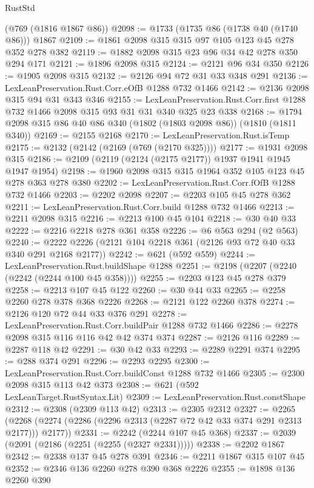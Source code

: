 \begin{lexlean}{RustStd}
\begin{coremodule}
    (@769 (@1816 @1867 @86))
@2098 := @1733 (@1735 @86 (@1738 @40 (@1740 @86))) @1867
@2109 := @1861 @2098 @315 @315 @97 @105 @123 @45 @278 @352 @278 @382
@2119 := @1882 @2098 @315 @23 @96 @34 @42 @278 @350 @294 @171
@2121 := @1896 @2098 @315
@2124 := @2121 @96 @34 @350
@2126 := @1905 @2098 @315
@2132 := @2126 @94 @72 @31 @33 @348 @291
@2136 := LexLeanPreservation.Rust.Corr.eOfB @1288 @732 @1466
@2142 := @2136 @2098 @315 @94 @31 @343 @346
@2155 := LexLeanPreservation.Rust.Corr.first
    @1288
    @732
    @1466
    @2098
    @315
    @93
    @31
    @31
    @340
    @325
    @23
    @338
@2168 := @1794 @2098 @315 @86 @40 @86 @340 (@1802 (@1803 @2098 @86)) (@1810 (@1811 @340))
@2169 := @2155 @2168
@2170 := LexLeanPreservation.Rust.isTemp
@2175 := @2132 (@2142 (@2169 (@769 (@2170 @325))))
@2177 := @1931 @2098 @315
@2186 := @2109 (@2119 (@2124 (@2175 @2177)) @1937 @1941 @1945 @1947 @1954)
@2198 := @1960 @2098 @315 @315 @1964 @352 @105 @123 @45 @278 @363 @278 @380
@2202 := LexLeanPreservation.Rust.Corr.fOfB @1288 @732 @1466
@2203 := @2202 @2098
@2207 := @2203 @105 @45 @278 @362
@2211 := LexLeanPreservation.Rust.Corr.build @1288 @732 @1466
@2213 := @2211 @2098 @315
@2216 := @2213 @100 @45 @104
@2218 := @30 @40 @33
@2222 := @2216 @2218 @278 @361 @358
@2226 := @6 @563 @294 (@2 @563)
@2240 := @2222 @2226 (@2121 @104 @2218 @361 (@2126 @93 @72 @40 @33 @340 @291 @2168 @2177))
@2242 := @621 (@592 @559)
@2244 := LexLeanPreservation.Rust.buildShape @1288
@2251 := @2198 (@2207 (@2240 (@2242 (@2244 @100 @45 @358))))
@2255 := @2203 @123 @45 @278 @379
@2258 := @2213 @107 @45 @122
@2260 := @30 @44 @33
@2265 := @2258 @2260 @278 @378 @368 @2226
@2268 := @2121 @122 @2260 @378
@2274 := @2126 @120 @72 @44 @33 @376 @291
@2278 := LexLeanPreservation.Rust.Corr.buildPair @1288 @732 @1466
@2286 := @2278 @2098 @315 @116 @116 @42 @42 @374 @374
@2287 := @2126 @116
@2289 := @2287 @118 @42
@2291 := @30 @42 @33
@2293 := @2289 @2291 @374
@2295 := @288 @374 @291
@2296 := @2293 @2295
@2300 := LexLeanPreservation.Rust.Corr.buildConst @1288 @732 @1466
@2305 := @2300 @2098 @315 @113 @42 @373
@2308 := @621 (@592 LexLeanTarget.RustSyntax.Lit)
@2309 := LexLeanPreservation.Rust.constShape
@2312 := @2308 (@2309 @113 @42)
@2313 := @2305 @2312
@2327 := @2265 (@2268 (@2274 (@2286 (@2296 @2313 (@2287 @72 @42 @33 @374 @291 @2313 @2177))) @2177))
@2331 := @2242 (@2244 @107 @45 @368)
@2337 := @2039 (@2091 (@2186 (@2251 (@2255 (@2327 @2331)))))
@2338 := @2202 @1867
@2342 := @2338 @137 @45 @278 @391
@2346 := @2211 @1867 @315 @107 @45
@2352 := @2346 @136 @2260 @278 @390 @368 @2226
@2355 := @1898 @136 @2260 @390

\end{coremodule}
\end{lexlean}
